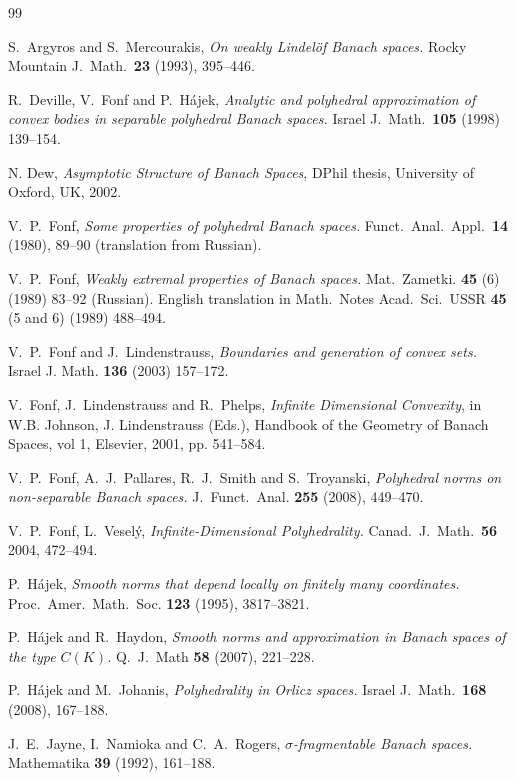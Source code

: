 \documentclass[12pt,a4paper]{amsart}
\theoremstyle{definition}
\theoremstyle{remark}
\begin{document}
%
\begin{thebibliography}{99}

 S.\ Argyros and S.\ Mercourakis, {\em On weakly
Lindel\"of Banach spaces.} Rocky Mountain J.\ Math.\ \textbf{23}
(1993), 395--446.

 R.\ Deville, V.\ Fonf and P.\ H\'ajek, {\em Analytic and
polyhedral approximation of convex bodies in separable polyhedral
Banach spaces.} Israel J.\ Math.\ \textbf{105} (1998) 139--154.

 N. Dew, {\em Asymptotic Structure of Banach Spaces},
DPhil thesis, University of Oxford, UK, 2002.

 V.\ P.\ Fonf, {\em Some properties of polyhedral Banach spaces.}
Funct.\ Anal.\ Appl.\ {\bf 14} (1980), 89--90 (translation from Russian).

 V.\ P.\ Fonf, {\em Weakly extremal properties of Banach spaces.}
Mat.\ Zametki. {\bf 45} (6) (1989) 83--92 (Russian). English translation
in Math.\ Notes Acad.\ Sci.\ USSR {\bf 45} (5 and 6) (1989) 488--494.

V.\ P.\ Fonf and J.\ Lindenstrauss, {\em Boundaries and generation of convex
sets.} Israel J. Math. {\bf 136} (2003) 157--172.

 V.\ Fonf, J.\ Lindenstrauss and R.\ Phelps, {\em Infinite
Dimensional Convexity}, in W.B. Johnson, J. Lindenstrauss (Eds.),
Handbook of the Geometry of Banach Spaces, vol 1, Elsevier, 2001, pp. 541--584.

 V.\ P.\ Fonf, A.\ J.\ Pallares, R.\ J.\ Smith and
S.\ Troyanski, {\em Polyhedral norms on non-separable Banach
spaces.} J.\ Funct.\ Anal. \textbf{255} (2008), 449--470.

 V.\ P.\ Fonf, L.\ Vesel\'{y}, {\em Infinite-Dimensional
Polyhedrality.} Canad.\  J.\ Math.\ \textbf{56} 2004, 472--494.

 P.\ H\'ajek, {\em Smooth norms that depend
locally on finitely many coordinates.} Proc.\ Amer.\ Math.\ Soc.
\textbf{123} (1995), 3817--3821.

 P.\ H\'ajek and R.\ Haydon, {\em Smooth norms and
approximation in Banach spaces of the type $C(K)$.} Q.\ J.\ Math
\textbf{58} (2007), 221--228.

 P.\ H\'ajek and M.\ Johanis, {\em Polyhedrality in Orlicz spaces.}
Israel J.\ Math.\ \textbf{168} (2008), 167--188.

 J.\ E.\ Jayne, I.\ Namioka and C.\ A.\ Rogers,
{\em $\sigma$-fragmentable Banach spaces.} Mathematika \textbf{39}
(1992), 161--188.


\end{thebibliography}
\end{document}
